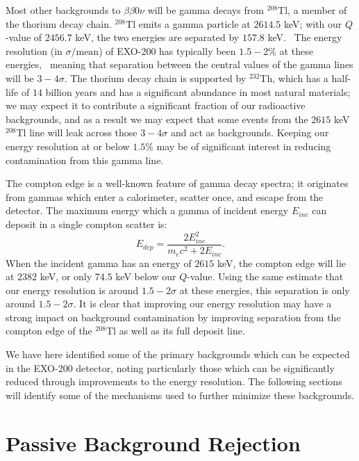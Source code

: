 Most other backgrounds to $\beta\beta 0\nu$ will be gamma decays from $^{208}$Tl, a member of the thorium decay chain.  $^{208}$Tl emits a gamma particle at $2614.5$ keV; with our $Q$-value of $2456.7$ keV, the two energies are separated by $157.8$ keV.~\cite{ENSDF}  The energy resolution (in $\sigma/\text{mean}$) of EXO-200 has typically been $1.5-2\%$ at these energies,~\cite{NewEXObb0nPaper_2014} meaning that separation between the central values of the gamma lines will be $3-4\sigma$.  The thorium decay chain is supported by $^{232}$Th, which has a half-life of $14$ billion years and has a significant abundance in most natural materials; we may expect it to contribute a significant fraction of our radioactive backgrounds, and as a result we may expect that some events from the $2615$ keV $^{208}$Tl line will leak across those $3-4\sigma$ and act as backgrounds.  Keeping our energy resolution at or below $1.5\%$ may be of significant interest in reducing contamination from this gamma line.

The compton edge is a well-known feature of gamma decay spectra; it originates from gammas which enter a calorimeter, scatter once, and escape from the detector.  The maximum energy which a gamma of incident energy $E_{inc}$ can deposit in a single compton scatter is:~\cite{Compton}
\begin{equation}
E_{dep} = \frac{2E_{inc}^2}{m_e c^2 + 2E_{inc}}.
\end{equation}
When the incident gamma has an energy of $2615$ keV, the compton edge will lie at $2382$ keV, or only $74.5$ keV below our $Q$-value.  Using the same estimate that our energy resolution is around $1.5-2\sigma$ at these energies, this separation is only around $1.5-2\sigma$.  It is clear that improving our energy resolution may have a strong impact on background contamination by improving separation from the compton edge of the $^{208}$Tl as well as its full deposit line.

We have here identified some of the primary backgrounds which can be expected in the EXO-200 detector, noting particularly those which can be significantly reduced through improvements to the energy resolution.  The following sections will identify some of the mechanisms used to further minimize these backgrounds.

\section{Passive Background Rejection}\label{sec:DetectorPassiveBackgroundRejection}

